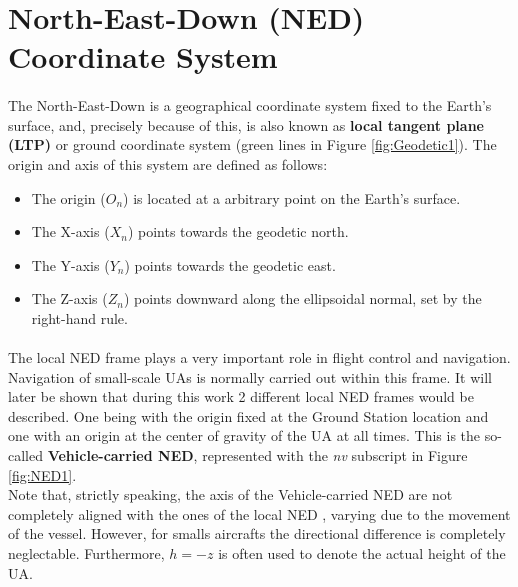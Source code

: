 \section{North-East-Down (NED) Coordinate System}\label{sec:ned}

\paragraph{} The North-East-Down is a geographical coordinate system fixed to the Earth's surface, and, precisely because of this, is also known as \textbf{local tangent plane (LTP)} or ground coordinate system (green lines in Figure \ref{fig:Geodetic1}). The origin and axis of this system are defined as follows: 
\begin{itemize}
\item{The origin (\textbf{$O_{n}$}) is located at a arbitrary point on the Earth's surface.}
\item{The X-axis (\textbf{$X_{n}$}) points towards the geodetic north.}
\item{The Y-axis (\textbf{$Y_{n}$}) points towards the geodetic east.}
\item{The Z-axis (\textbf{$Z_{n}$}) points downward along the ellipsoidal normal, set by the right-hand rule.}
\end{itemize}

\paragraph{} The local NED frame plays a very important role in flight control and navigation.
Navigation of small-scale UAs is normally carried out within this frame. It will later be shown that during this work 2 different local NED frames would be described. One being with the origin fixed at the Ground Station location and one with an origin at the center of gravity of the UA at all times. This is the so-called \textbf{Vehicle-carried NED}, represented with the \textit{nv} subscript in Figure \ref{fig:NED1}.\\
Note that, strictly speaking, the axis of the Vehicle-carried NED are not completely aligned with the ones of the local NED , varying due to the movement of the vessel. However, for smalls aircrafts the directional difference is completely neglectable. Furthermore, $h = -z$ is often used to denote the actual height of the UA.

